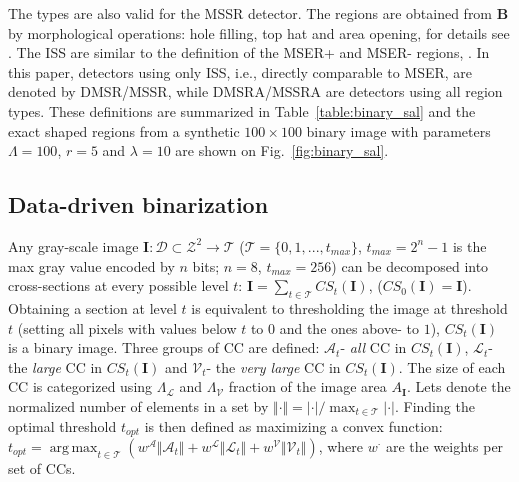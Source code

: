 \documentclass{article}
\def\B{{\mathbf B}}
\def\I{{\mathbf I}}
\def\mcT{{\mathcal{T}}}
\def\mcD{{\mathcal{D}}}
\def\mcA{{\mathcal{A}}}
\def\mcL{{\mathcal{L}}}
\def\mcV{{\mathcal{V}}}
\DeclareMathOperator*{\argmax}{arg\,max}
\begin{document}
The types are also valid for the MSSR detector. The regions are obtained from $\B$ by morphological operations: hole filling, top hat and area opening, for details see \cite{RangMSSR06, RangHumpb06}. The ISS are similar to the definition of the MSER+ and MSER- regions, \cite{Matas2002BMVC}. In this paper, detectors using only ISS, i.e., directly comparable to MSER, are denoted by DMSR/MSSR, while DMSRA/MSSRA are detectors using all region types. These definitions are summarized in Table~\ref{table:binary_sal} and the exact shaped regions from a synthetic $100 \times 100$ binary image with parameters $\Lambda=100$, $r=5$ and $\lambda = 10$ are shown on Fig.~\ref{fig:binary_sal}.

\subsection{Data-driven binarization}
\label{ssec:binarize}
Any gray-scale image  $\I: \mcD \subset \mathcal{Z}^2 \rightarrow \mcT $ ($\mcT = \{0,1, ..., t_{max}\}$, $t_{max} = 2^n-1$ is the max gray value encoded by $n$ bits; $n=8$, $t_{max}=256$) can be decomposed into cross-sections at
every possible level $t$:  $\I = \sum_{t \in \mcT}CS_t(\I)$, 
($CS_0(\I) = \I$). Obtaining a section at level $t$ is equivalent to thresholding the image at threshold $t$ (setting all pixels with values below $t$ to $0$ and the ones above- to $1$), $CS_t(\I)$ is a binary image. 
Three groups of CC are defined: $\mcA_t$- {\em all} CC in $CS_t(\I)$, $\mcL_t$- the {\em large} CC in $CS_t(\I)$ and 
$\mcV_t$- the {\em very large} CC in $CS_t(\I)$.  The size of each CC is categorized using $\Lambda_{\mcL}$ and $\Lambda_{\mcV}$ fraction of the image area $A_{\I}$. Lets denote the normalized number of elements in a set by $\Vert \cdot \Vert = |\cdot| / \max_{t \in \mcT}|\cdot|$.
Finding the optimal threshold $t_{opt}$ is then defined as maximizing a convex function:
$t_{opt} = \argmax_{t \in \mcT}( w^{\mcA} \Vert \mcA_t \Vert + w^{\mcL} \Vert \mcL_t \Vert + w^{\mcV} \Vert \mcV_t \Vert )$,
where $w^{\cdot}$ are the weights per set of CCs.  
\end{document}
